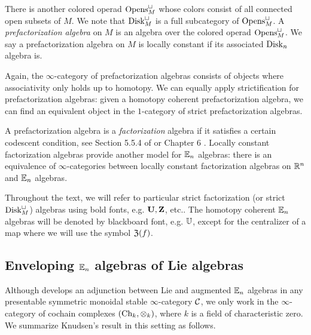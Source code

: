 \documentclass[11pt]{amsart}
\numberwithin{equation}{section}
\begin{document}
There is another colored operad ${\rm Opens}^\sqcup_M$ whose colors consist of all connected open subsets of $M$. 
We note that ${\rm Disk}^\sqcup_M$ is a full subcategory of ${\rm Opens}^\sqcup_M$.
A {\em prefactorization algebra} on $M$ is an algebra over the colored operad ${\rm Opens}^{\sqcup}_M$. 
We say a prefactorization algebra on $M$ is locally constant if its associated ${\rm Disk}_n$ algebra is.

Again, the $\infty$-category of prefactorization algebras consists of objects where associativity only holds up to homotopy. 
We can equally apply strictification for prefactorization algebras: given a homotopy coherent prefactorization algebra, we can find an equivalent object in the $1$-category of strict prefactorization algebras. 

A prefactorization algebra is a {\em factorization} algebra if it satisfies a certain codescent condition, see Section 5.5.4 of \cite{LurieHA} or Chapter 6 \cite{CG1}. 
Locally constant factorization algebras provide another model for $\mathbb E_n$ algebras: there is an equivalence of $\infty$-categories between locally constant factorization algebras on $\mathbb R^n$ and $\mathbb E_n$ algebras. 

Throughout the text, we will refer to particular strict factorization (or strict ${\rm Disk}^\sqcup_M$) algebras using bold fonts, e.g. $\mathbf U, \mathbf Z$, etc.. 
The homotopy coherent $\mathbb E_n$ algebras will be denoted by blackboard font, e.g. $\mathbb U$, except for the centralizer of a map where we will use the symbol $\mathfrak Z(f)$. 
 
\subsection{Enveloping $\mathbb E_n$ algebras of Lie algebras}
\label{sec: enveloping}

Although \cite{Knudsen} develops an adjunction between Lie and augmented $\mathbb E_n$ algebras
in any presentable symmetric monoidal stable $\infty$-category $\mathcal C$,
we only work in the $\infty$-category of cochain complexes $({\rm Ch}_k, \otimes_k)$, 
where $k$ is a field of characteristic zero.
We summarize Knudsen's result in this setting as follows.
\end{document}
